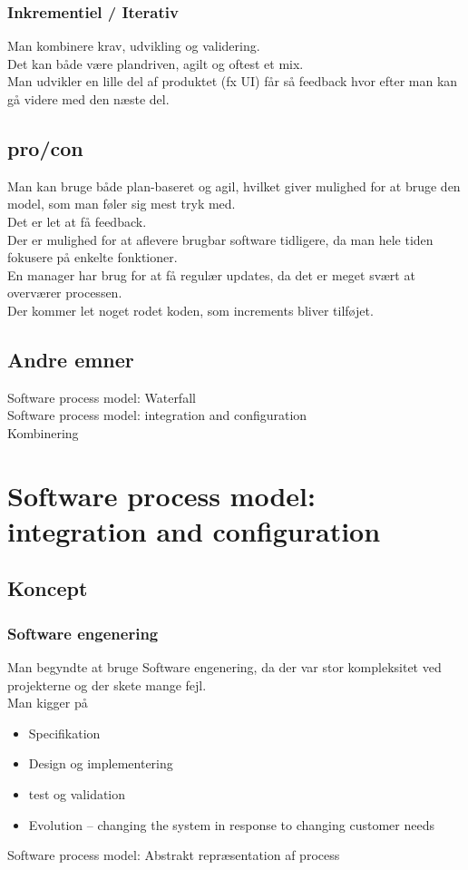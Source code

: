 \documentclass[11pt,a4paper]{article}
\begin{document}
\subsubsection*{Inkrementiel / Iterativ}
Man kombinere krav, udvikling og validering.\\
Det kan både være plandriven, agilt og oftest et mix.\\
Man udvikler en lille del af produktet (fx UI) får så feedback hvor efter man kan gå videre med den næste del.
\subsection{pro/con}
Man kan bruge både plan-baseret og agil, hvilket giver mulighed for at bruge den model, som man føler sig mest tryk med.\\
Det er let at få feedback.\\
Der er mulighed for at aflevere brugbar software tidligere, da man hele tiden fokusere på enkelte fonktioner.\\
En manager har brug for at få regulær updates, da det er meget svært at overværer processen.\\
Der kommer let noget rodet koden, som increments bliver tilføjet.

\subsection{Andre emner}
Software process model: Waterfall\\
Software process model: integration and configuration\\
Kombinering
\newpage

\section{Software process model: integration and configuration}
\subsection{Koncept}
\subsubsection*{Software engenering}
Man begyndte at bruge Software engenering, da der var stor kompleksitet ved projekterne og der skete mange fejl.\\
Man kigger på 
\begin{itemize}
\item Specifikation
\item Design og implementering
\item test og validation
\item Evolution – changing the system in response to changing customer needs
\end{itemize}
Software process model: Abstrakt repræsentation af process
\end{document}
